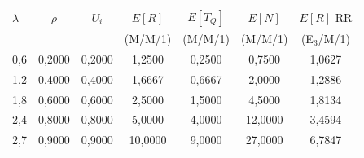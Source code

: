 \begin{tabular}{lcccccc}
    \toprule
    $\lambda$ & $\rho$ & $U_i$ & $E[R]$ & $E[T_Q]$ & $E[N]$ & $E[R]$ RR \\
    & & & (M/M/1) & (M/M/1) & (M/M/1) & (E$_3$/M/1) \\
    \midrule
    0,6 & 0,2000 & 0,2000 & 1,2500 & 0,2500 & 0,7500 & 1,0627 \\
    1,2 & 0,4000 & 0,4000 & 1,6667 & 0,6667 & 2,0000 & 1,2886 \\
    1,8 & 0,6000 & 0,6000 & 2,5000 & 1,5000 & 4,5000 & 1,8134 \\
    2,4 & 0,8000 & 0,8000 & 5,0000 & 4,0000 & 12,0000 & 3,4594 \\
    2,7 & 0,9000 & 0,9000 & 10,0000 & 9,0000 & 27,0000 & 6,7847 \\
    \bottomrule
\end{tabular}
